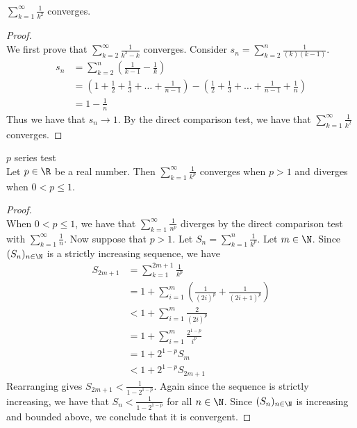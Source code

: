 \documentclass[a4paper]{article}
\begin{document}
\begin{eg}{}{}\\ $\sum_{k=1}^\infty\frac{1}{k^2}$ converges. 
\begin{proof}\\ We first prove that $\sum_{k=2}^{\infty}\frac{1}{k^2-k}$ converges. Consider $s_n=\sum_{k=2}^{n}\frac{1}{(k)(k-1)}$. 
\begin{align*}
s_n&=\sum_{k=2}^{n}\left(\frac{1}{k-1}-\frac{1}{k}\right)\\
&=\left(1+\frac{1}{2}+\frac{1}{3}+\dots+\frac{1}{n-1}\right)-\left(\frac{1}{2}+\frac{1}{3}+\dots+\frac{1}{n-1}+\frac{1}{n}\right)\\
&=1-\frac{1}{n}
\end{align*}
Thus we have that $s_n\to1$. By the direct comparison test, we have that $\sum_{k=1}^\infty\frac{1}{k^2}$ converges. 
\end{proof}
\end{eg}

\begin{thm}{$p$ series test}{}\\
Let $p\in\R$ be a real number. Then $\sum_{k=1}^{\infty}\frac{1}{k^p}$ converges when $p>1$ and diverges when $0<p\leq 1$. 
\begin{proof}\\
When $0<p\leq1$, we have that $\sum_{k=1}^{\infty}\frac{1}{n^p}$ diverges by the direct comparison test with $\sum_{k=1}^\infty\frac{1}{n}$. Now suppose that $p>1$. Let $S_n=\sum_{k=1}^n\frac{1}{k^p}$. Let $m\in\N$. Since $(S_n)_{n\in\N}$ is a strictly increasing sequence, we have
\begin{align*}
S_{2m+1}&=\sum_{k=1}^{2m+1}\frac{1}{k^p}\\
&=1+\sum_{i=1}^m\left(\frac{1}{(2i)^p}+\frac{1}{(2i+1)^p}\right)\\
&<1+\sum_{i=1}^m\frac{2}{(2i)^p}\\
&=1+\sum_{i=1}^m\frac{2^{1-p}}{i^p}\\
&=1+2^{1-p}S_m\\
&<1+2^{1-p}S_{2m+1}
\end{align*}
Rearranging gives $S_{2m+1}<\frac{1}{1-2^{1-p}}$. Again since the sequence is strictly increasing, we have that $S_n<\frac{1}{1-2^{1-p}}$ for all $n\in\N$. Since $(S_n)_{n\in\N}$ is increasing and bounded above, we conclude that it is convergent. 
\end{proof}
\end{thm}
\end{document}
